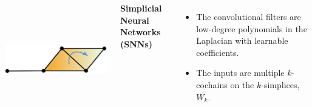 \documentclass[landscape,a0paper,blockverticalspace = 5mm]{tikzposter}
\begin{document}
\begin{columns}
{{\begin{center}
\begin{minipage}{0.2\linewidth}
\begin{center}
          \vspace{1.2cm}
        
          \end{center}
      \end{minipage} \hspace{3.5cm}
	\begin{minipage}{0.2\linewidth}
	\begin{center}\
	\vspace{0.1cm}
          \includegraphics[height=3.9cm]{figures/glap2.png}
          
        
          \end{center}
      \end{minipage} 
      \end{center}



 \begin{center} 
\vspace{-1.5cm}
\Large{\textbf{Simplicial Neural Networks (SNNs)}}
\end{center}
\vspace{-0.5cm}
\begin{itemize}
\item The convolutional filters are low-degree polynomials in the Laplacian with learnable coefficients.
\item The inputs are multiple $k$-cochains on the $k$-simplices, $W_k$.
\end{itemize}
 
}}
\end{columns}
\end{document}
